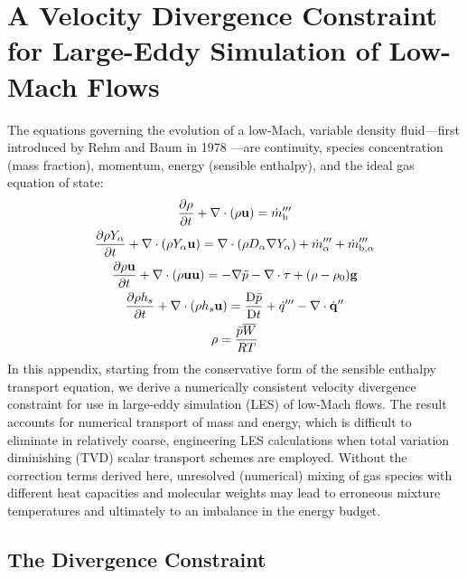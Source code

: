 




\chapter{A Velocity Divergence Constraint for Large-Eddy Simulation of Low-Mach Flows}
\label{app_divergence}

The equations governing the evolution of a low-Mach, variable density fluid---first introduced by Rehm and Baum in 1978 \cite{Rehm:1}---are continuity, species concentration (mass fraction), momentum, energy (sensible enthalpy), and the ideal gas equation of state:
\begin{gather}
\label{eqn_rho} \frac{\partial \rho}{\partial t} + \nabla\cdot(\rho\mathbf{u}) = \dot{m}_{\rm b}''' \\
\label{eqn_Y_a} \frac{\partial \rho Y_\alpha}{\partial t} + \nabla\cdot(\rho Y_\alpha \mathbf{u}) = \nabla\cdot (\rho D_\alpha \nabla Y_\alpha) + \dot{m}_\alpha^{\prime\prime\prime} + \dot{m}_{{\rm b},\alpha}^{\prime\prime\prime} \\
\label{eqn_u}   \frac{\partial \rho \mathbf{u}}{\partial t} + \nabla\cdot(\rho \mathbf{u} \mathbf{u}) = -\nabla \tilde{p} - \nabla\cdot\mathbf{\tau} + (\rho-\rho_0) \mathbf{g} \\
\label{eqn_h_s} \frac{\partial \rho h_s}{\partial t} + \nabla\cdot(\rho h_s \mathbf{u}) = \frac{\mbox{D} \bar{p}}{\mbox{D} t} + \dot{q}^{\prime\prime\prime} - \nabla\cdot \dot{\mathbf{q}}^{\prime\prime} \\
\label{eqn_eos} \rho = \frac{\bar{p} \overline{W}}{RT}
\end{gather}
In this appendix, starting from the conservative form of the sensible enthalpy transport equation, we derive a numerically consistent velocity divergence constraint for use in large-eddy simulation (LES) of low-Mach flows.  The result accounts for numerical transport of mass and energy, which is difficult to eliminate in relatively coarse, engineering LES calculations when total variation diminishing (TVD) scalar transport schemes are employed.  Without the correction terms derived here, unresolved (numerical) mixing of gas species with different heat capacities and molecular weights may lead to erroneous mixture temperatures and ultimately to an imbalance in the energy budget.

\section{The Divergence Constraint}
\label{div_constraint}

